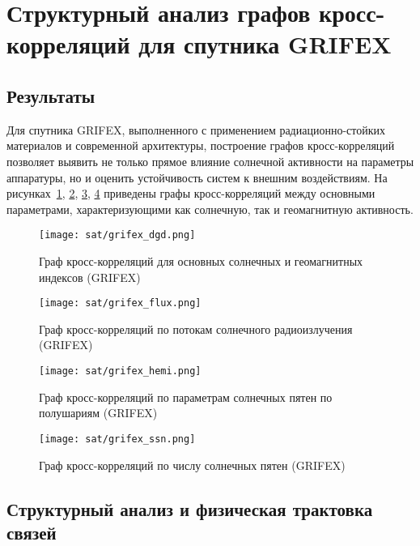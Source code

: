 \section{Структурный анализ графов кросс-корреляций для спутника GRIFEX}

\subsection{Результаты}

Для спутника GRIFEX, выполненного с применением радиационно-стойких материалов и современной архитектуры, построение графов кросс-корреляций позволяет выявить не только прямое влияние солнечной активности на параметры аппаратуры, но и оценить устойчивость систем к внешним воздействиям. На рисунках~\ref{fig:grifex_dgd}, \ref{fig:grifex_flux}, \ref{fig:grifex_hemi}, \ref{fig:grifex_ssn} приведены графы кросс-корреляций между основными параметрами, характеризующими как солнечную, так и геомагнитную активность.

\begin{figure}[H]
	\centering
	\texttt{[image: sat/grifex\_dgd.png]}
	\caption{Граф кросс-корреляций для основных солнечных и геомагнитных индексов (GRIFEX)}
	\label{fig:grifex_dgd}
\end{figure}

\begin{figure}[H]
	\centering
	\texttt{[image: sat/grifex\_flux.png]}
	\caption{Граф кросс-корреляций по потокам солнечного радиоизлучения (GRIFEX)}
	\label{fig:grifex_flux}
\end{figure}

\begin{figure}[H]
	\centering
	\texttt{[image: sat/grifex\_hemi.png]}
	\caption{Граф кросс-корреляций по параметрам солнечных пятен по полушариям (GRIFEX)}
	\label{fig:grifex_hemi}
\end{figure}

\begin{figure}[H]
	\centering
	\texttt{[image: sat/grifex\_ssn.png]}
	\caption{Граф кросс-корреляций по числу солнечных пятен (GRIFEX)}
	\label{fig:grifex_ssn}
\end{figure}

\subsection{Структурный анализ и физическая трактовка связей}

